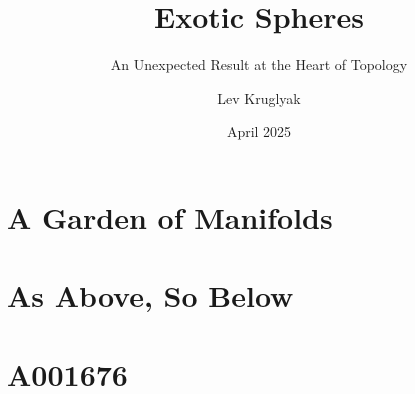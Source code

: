 \documentclass{lkx_thesis}
\title{Exotic Spheres}
\subtitle{An Unexpected Result at the Heart of Topology}
\author{Lev Kruglyak}
\date{April 2025}
\begin{document}
% 

\lkxtoc



\part{A Garden of Manifolds}





\part{As Above, So Below}






\part{A001676}

\lkxrefs
\lkxindex
\end{document}
